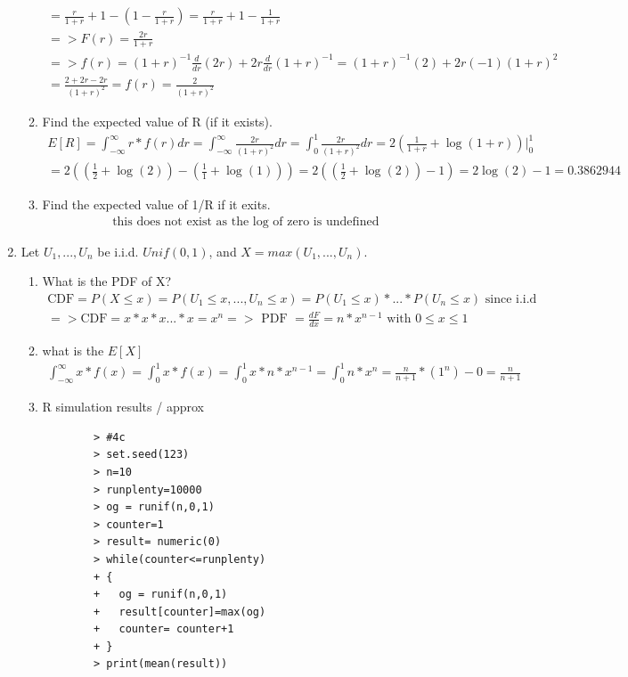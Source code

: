 \documentclass[11pt]{article}
\begin{document}
\begin{enumerate}
\begin{enumerate}
\begin{gather}
	= \frac{r}{1+r} + 1 - (1-\frac{r}{1+r}) = \frac{r}{1+r} + 1 - \frac{1}{1+r} \\
	=> F(r) = \frac{2r}{1+r} \\
	=> f(r) = (1+r)^{-1} \frac{d}{dr}(2r)+ 2r\frac{d}{dr}(1+r)^{-1}=(1+r)^{-1}(2)+ 2r(-1)(1+r)^{2} \\
	= \frac{2+2r - 2r}{(1+r)^{2}} = f(r) = \frac{2}{(1+r)^{2}}
	\end{gather}
	\item Find the expected value of R (if it exists).
	\begin{gather}
	E[R] = \int_{-\infty}^{\infty}r*f(r)dr = \int_{-\infty}^{\infty}\frac{2r}{(1+r)^{2}}dr = \int_{0}^{1}\frac{2r}{(1+r)^{2}}dr = 2(\frac{1}{1+r} + \log(1+r))\Big|_0^1\\ 
	= 2((\frac{1}{2} + \log(2)) - (\frac{1}{1} + \log(1))) = 2((\frac{1}{2} + \log(2)) - 1) = 2\log(2) - 1 = 0.3862944
	\end{gather}
	\item Find the expected value of 1/R if it exits.
	\begin{gather}
		\text{this does not exist as the log of zero is undefined}
	\end{gather}
\end{enumerate}
\item Let $U_1,...,U_n$ be i.i.d. $Unif(0,1)$, and $X = max(U_1,...,U_n)$.
\begin{enumerate}
	\item What is the PDF of X?
	\begin{gather}
		\text{CDF} = P(X \le x) = P(U_1 \le x , ... , U_n \le x) = P(U_1 \le x) *  ... * P(U_n \le x) \text{ since i.i.d}\\
		=> \text{CDF} = x*x*x...*x = x^n => \text{ PDF } = \frac{dF}{dx} = n*x^{n-1} \text{ with } 0 \le x \le 1
	\end{gather}
	\item what is the $E[X]$
	\begin{gather}
		\int_{-\infty}^{\infty}x*f(x) = \int_{0}^{1}x*f(x) = \int_{0}^{1}x*n*x^{n-1} = \int_{0}^{1}n*x^{n} =\frac{n}{n+1}*(1^n) - 0 = \frac{n}{n+1}
	\end{gather}
	\item R simulation results / approx
	\begin{verbatim}
		> #4c
		> set.seed(123)
		> n=10
		> runplenty=10000
		> og = runif(n,0,1)
		> counter=1
		> result= numeric(0)
		> while(counter<=runplenty)
		+ {
		+   og = runif(n,0,1)
		+   result[counter]=max(og)
		+   counter= counter+1
		+ }
		> print(mean(result))

\end{verbatim}
\end{enumerate}
\end{enumerate}
\end{document}
